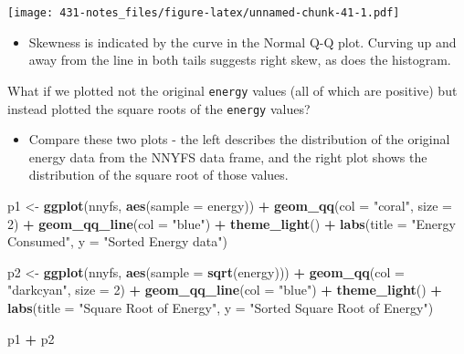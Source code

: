 \documentclass[
]{book}
\newenvironment{Shaded}{\begin{snugshade}}{\end{snugshade}}
\newcommand{\DataTypeTok}[1]{\textcolor[rgb]{0.13,0.29,0.53}{#1}}
\newcommand{\DecValTok}[1]{\textcolor[rgb]{0.00,0.00,0.81}{#1}}
\newcommand{\KeywordTok}[1]{\textcolor[rgb]{0.13,0.29,0.53}{\textbf{#1}}}
\newcommand{\NormalTok}[1]{#1}
\newcommand{\OperatorTok}[1]{\textcolor[rgb]{0.81,0.36,0.00}{\textbf{#1}}}
\newcommand{\StringTok}[1]{\textcolor[rgb]{0.31,0.60,0.02}{#1}}
\providecommand{\tightlist}{%
  \setlength{\itemsep}{0pt}\setlength{\parskip}{0pt}}
\begin{document}
\texttt{[image: 431-notes\_files/figure-latex/unnamed-chunk-41-1.pdf]}

\begin{itemize}
\tightlist
\item
  Skewness is indicated by the curve in the Normal Q-Q plot. Curving up and away from the line in both tails suggests right skew, as does the histogram.
\end{itemize}

What if we plotted not the original \texttt{energy} values (all of which are positive) but instead plotted the square roots of the \texttt{energy} values?

\begin{itemize}
\tightlist
\item
  Compare these two plots - the left describes the distribution of the original energy data from the NNYFS data frame, and the right plot shows the distribution of the square root of those values.
\end{itemize}

\begin{Shaded}
\begin{Highlighting}[]
\NormalTok{p1 <-}\StringTok{ }\KeywordTok{ggplot}\NormalTok{(nnyfs, }\KeywordTok{aes}\NormalTok{(}\DataTypeTok{sample =}\NormalTok{ energy)) }\OperatorTok{+}
\StringTok{    }\KeywordTok{geom_qq}\NormalTok{(}\DataTypeTok{col =} \StringTok{"coral"}\NormalTok{, }\DataTypeTok{size =} \DecValTok{2}\NormalTok{) }\OperatorTok{+}\StringTok{ }
\StringTok{    }\KeywordTok{geom_qq_line}\NormalTok{(}\DataTypeTok{col =} \StringTok{"blue"}\NormalTok{) }\OperatorTok{+}
\StringTok{    }\KeywordTok{theme_light}\NormalTok{() }\OperatorTok{+}
\StringTok{    }\KeywordTok{labs}\NormalTok{(}\DataTypeTok{title =} \StringTok{"Energy Consumed"}\NormalTok{,}
         \DataTypeTok{y =} \StringTok{"Sorted Energy data"}\NormalTok{)}

\NormalTok{p2 <-}\StringTok{ }\KeywordTok{ggplot}\NormalTok{(nnyfs, }\KeywordTok{aes}\NormalTok{(}\DataTypeTok{sample =} \KeywordTok{sqrt}\NormalTok{(energy))) }\OperatorTok{+}
\StringTok{    }\KeywordTok{geom_qq}\NormalTok{(}\DataTypeTok{col =} \StringTok{"darkcyan"}\NormalTok{, }\DataTypeTok{size =} \DecValTok{2}\NormalTok{) }\OperatorTok{+}\StringTok{ }
\StringTok{    }\KeywordTok{geom_qq_line}\NormalTok{(}\DataTypeTok{col =} \StringTok{"blue"}\NormalTok{) }\OperatorTok{+}
\StringTok{    }\KeywordTok{theme_light}\NormalTok{() }\OperatorTok{+}
\StringTok{    }\KeywordTok{labs}\NormalTok{(}\DataTypeTok{title =} \StringTok{"Square Root of Energy"}\NormalTok{,}
         \DataTypeTok{y =} \StringTok{"Sorted Square Root of Energy"}\NormalTok{)}

\NormalTok{p1 }\OperatorTok{+}\StringTok{ }\NormalTok{p2}
\end{Highlighting}
\end{Shaded}
\end{document}
